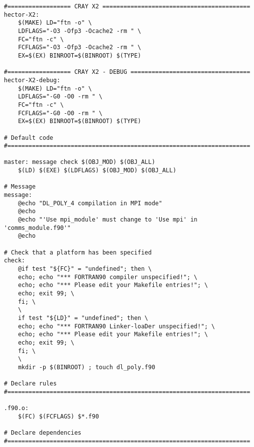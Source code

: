 \begin{verbatim}
#================== CRAY X2 ==========================================
hector-X2:
	$(MAKE) LD="ftn -o" \
	LDFLAGS="-O3 -Ofp3 -Ocache2 -rm " \
	FC="ftn -c" \
	FCFLAGS="-O3 -Ofp3 -Ocache2 -rm " \
	EX=$(EX) BINROOT=$(BINROOT) $(TYPE)

#================== CRAY X2 - DEBUG ==================================
hector-X2-debug:
	$(MAKE) LD="ftn -o" \
	LDFLAGS="-G0 -O0 -rm " \
	FC="ftn -c" \
	FCFLAGS="-G0 -O0 -rm " \
	EX=$(EX) BINROOT=$(BINROOT) $(TYPE)

# Default code
#=====================================================================

master: message check $(OBJ_MOD) $(OBJ_ALL)
	$(LD) $(EXE) $(LDFLAGS) $(OBJ_MOD) $(OBJ_ALL)

# Message
message:
	@echo "DL_POLY_4 compilation in MPI mode"
	@echo
	@echo "'Use mpi_module' must change to 'Use mpi' in 'comms_module.f90'"
	@echo

# Check that a platform has been specified
check:
	@if test "${FC}" = "undefined"; then \
	echo; echo "*** FORTRAN90 compiler unspecified!"; \
	echo; echo "*** Please edit your Makefile entries!"; \
	echo; exit 99; \
	fi; \
	\
	if test "${LD}" = "undefined"; then \
	echo; echo "*** FORTRAN90 Linker-loaDer unspecified!"; \
	echo; echo "*** Please edit your Makefile entries!"; \
	echo; exit 99; \
	fi; \
	\
	mkdir -p $(BINROOT) ; touch dl_poly.f90

# Declare rules
#=====================================================================

.f90.o:
	$(FC) $(FCFLAGS) $*.f90

# Declare dependencies
#=====================================================================


\end{verbatim}
